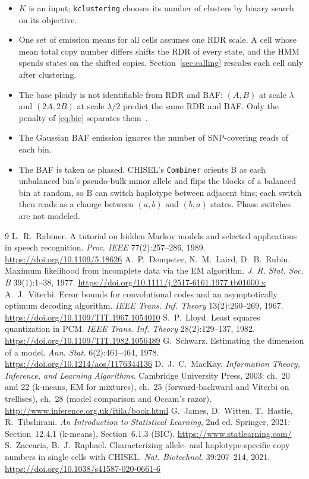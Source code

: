 \documentclass[11pt]{article}
\newcommand{\code}[1]{\texttt{#1}}
\begin{document}
\begin{itemize}[nosep]
\item $K$ is an input; \code{kclustering} chooses its number of clusters by binary search on its
  objective.
\item One set of emission means for all cells assumes one RDR scale. A cell whose mean total copy
  number differs shifts the RDR of every state, and the HMM spends states on the shifted copies.
  Section~\ref{sec:calling} rescales each cell only after clustering.
\item The base ploidy is not identifiable from RDR and BAF: $(A, B)$ at scale $\lambda$ and
  $(2A, 2B)$ at scale $\lambda/2$ predict the same RDR and BAF. Only the penalty of \eqref{eq:bic}
  separates them~\cite{schwarz1978,mackay2003}.
\item The Gaussian BAF emission ignores the number of SNP-covering reads of each bin.
\item The BAF is taken as phased. CHISEL's \code{Combiner} orients B as each unbalanced bin's
  pseudo-bulk minor allele and flips the blocks of a balanced bin at random, so B can switch
  haplotype between adjacent bins; each switch then reads as a change between $(a, b)$ and
  $(b, a)$ states. Phase switches are not modeled.
\end{itemize}

\begin{thebibliography}{9}
 L.~R.~Rabiner. A tutorial on hidden Markov models and selected applications
  in speech recognition. \emph{Proc. IEEE} 77(2):257--286, 1989.
  \url{https://doi.org/10.1109/5.18626}
 A.~P.~Dempster, N.~M.~Laird, D.~B.~Rubin. Maximum likelihood from
  incomplete data via the EM algorithm. \emph{J. R. Stat. Soc. B} 39(1):1--38, 1977.
  \url{https://doi.org/10.1111/j.2517-6161.1977.tb01600.x}
 A.~J.~Viterbi. Error bounds for convolutional codes and an asymptotically
  optimum decoding algorithm. \emph{IEEE Trans. Inf. Theory} 13(2):260--269, 1967.
  \url{https://doi.org/10.1109/TIT.1967.1054010}
 S.~P.~Lloyd. Least squares quantization in PCM. \emph{IEEE Trans. Inf.
  Theory} 28(2):129--137, 1982. \url{https://doi.org/10.1109/TIT.1982.1056489}
 G.~Schwarz. Estimating the dimension of a model. \emph{Ann. Stat.}
  6(2):461--464, 1978. \url{https://doi.org/10.1214/aos/1176344136}
 D.~J.~C.~MacKay. \emph{Information Theory, Inference, and Learning
  Algorithms}. Cambridge University Press, 2003: ch.~20 and 22 (k-means, EM for mixtures),
  ch.~25 (forward-backward and Viterbi on trellises), ch.~28 (model comparison and Occam's
  razor). \url{http://www.inference.org.uk/itila/book.html}
 G.~James, D.~Witten, T.~Hastie, R.~Tibshirani. \emph{An Introduction to
  Statistical Learning}, 2nd ed. Springer, 2021: Section~12.4.1 (k-means), Section~6.1.3 (BIC).
  \url{https://www.statlearning.com/}
 S.~Zaccaria, B.~J.~Raphael. Characterizing allele- and
  haplotype-specific copy numbers in single cells with CHISEL. \emph{Nat. Biotechnol.}
  39:207--214, 2021. \url{https://doi.org/10.1038/s41587-020-0661-6}
\end{thebibliography}
\end{document}
